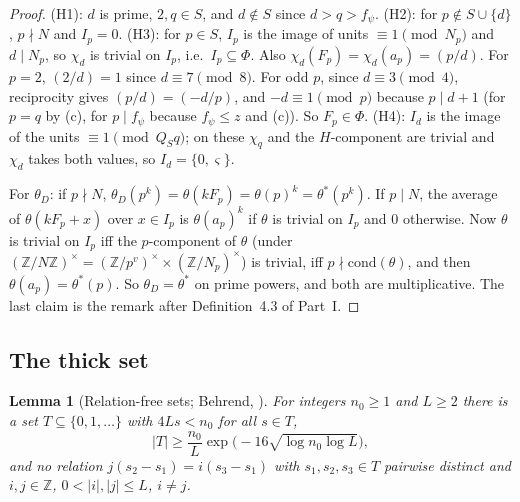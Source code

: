 \documentclass[11pt]{amsart}
\newcommand{\Z}{\mathbb{Z}}
\theoremstyle{plain}
\newtheorem{lemma}[theorem]{Lemma}
\theoremstyle{definition}
\numberwithin{equation}{section}
\begin{document}
\begin{proof}
(H1): $d$ is prime, $2,q\in S$, and $d\notin S$ since $d>q>f_\psi$. (H2): for $p\notin S\cup\{d\}$,
$p\nmid N$ and $I_p=0$. (H3): for $p\in S$, $I_p$ is the image of units $\equiv1\pmod{N_p}$ and
$d\mid N_p$, so $\chi_d$ is trivial on $I_p$, i.e.\ $I_p\subseteq\Phi$. Also
$\chi_d(F_p)=\chi_d(a_p)=(p/d)$. For $p=2$, $(2/d)=1$ since $d\equiv7\pmod8$. For odd $p$, since
$d\equiv3\pmod4$, reciprocity gives $(p/d)=(-d/p)$, and $-d\equiv1\pmod p$ because $p\mid d+1$
(for $p=q$ by (c), for $p\mid f_\psi$ because $f_\psi\le z$ and (c)). So $F_p\in\Phi$. (H4): $I_d$ is
the image of the units $\equiv1\pmod{Q_Sq}$; on these $\chi_q$ and the $H$-component are trivial and
$\chi_d$ takes both values, so $I_d=\{0,\varsigma\}$.

For $\theta_D$: if $p\nmid N$, $\theta_D(p^k)=\theta(kF_p)=\theta(p)^k=\theta^\ast(p^k)$. If $p\mid N$,
the average of $\theta(kF_p+x)$ over $x\in I_p$ is $\theta(a_p)^k$ if $\theta$ is trivial on $I_p$
and $0$ otherwise. Now $\theta$ is trivial on $I_p$ iff the $p$-component of $\theta$ (under
$(\Z/N\Z)^\times=(\Z/p^v)^\times\times(\Z/N_p)^\times$) is trivial, iff $p\nmid\mathrm{cond}(\theta)$,
and then $\theta(a_p)=\theta^\ast(p)$. So $\theta_D=\theta^\ast$ on prime powers, and both are
multiplicative. The last claim is the remark after Definition~4.3 of Part~I.
\end{proof}

\subsection{The thick set}

\begin{lemma}[Relation-free sets; Behrend, ]\label{lem:behrend}
For integers $n_0\ge1$ and $L\ge2$ there is a set $T\subseteq\{0,1,\dots\}$ with $4Ls<n_0$ for
all $s\in T$,
\[
|T|\ge\frac{n_0}{L}\exp\bigl(-16\sqrt{\log n_0\log L}\bigr),
\]
and no relation $j(s_2-s_1)=i(s_3-s_1)$ with $s_1,s_2,s_3\in T$ pairwise distinct and
$i,j\in\Z$, $0<|i|,|j|\le L$, $i\neq j$.
\end{lemma}
\end{document}
